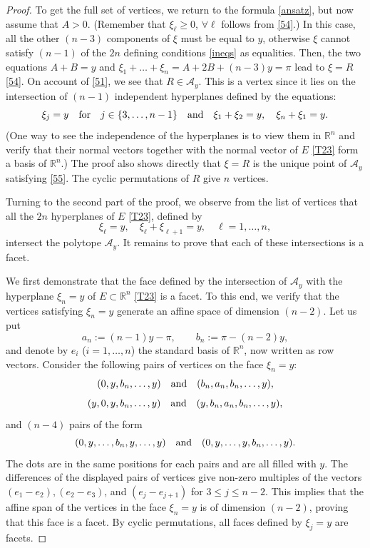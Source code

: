 \documentclass[a4paper,11pt,reqno]{amsart}
\theoremstyle{definition}
\numberwithin{equation}{section}
\newcommand{\be}{\begin{equation}}
\newcommand{\ee}{\end{equation}}
\def\cA{{\mathcal A}}                       %
\def\bR{{\mathbb R}}                        %
\begin{document}
\begin{proof}
 To get the full set of  vertices, we return to the formula \eqref{ansatz}, but now assume that $ A>0$.
 (Remember that  $\xi_\ell \geq 0$, $\forall \ell$ follows from  \eqref{54}.)
 In this case, all the other $(n-3)$ components of $\xi$ must be equal to $y$, otherwise $\xi$ cannot satisfy $(n-1)$ of the
 $2n$ defining  conditions \eqref{ineqs} as equalities. Then, the two equations $A + B =y$ and
 $\xi_1 + \dots + \xi_n= A + 2B + (n-3) y = \pi$  lead to $\xi=R$ \eqref{54}.
 On account of \eqref{51}, we see that $R \in \cA_y$.
 This is a vertex since
 it lies on the intersection of $(n-1)$ independent hyperplanes defined by
the equations:
\be
\xi_j = y \quad \hbox{for}\quad j \in \{3, \dots, n-1\}
\quad\hbox{and}\quad \xi_{1} + \xi_{2} = y, \quad \xi_{n} + \xi_1 =y.
\label{55}\ee
(One way to see
the independence of the hyperplanes is to view them in $\bR^n$ and verify that their normal vectors together with the
normal vector of $E$ \eqref{T23} form a basis of $\bR^n$.)
The proof also shows directly that $\xi=R$ is the unique point of $\cA_y$ satisfying \eqref{55}.
The cyclic permutations of $R$ give $n$ vertices.

Turning to the second part of the proof, we observe
from the  list of vertices that all the $2n$ hyperplanes of $E$ \eqref{T23}, defined by
\be
\xi_\ell = y,\quad \xi_\ell + \xi_{\ell+1}=y, \quad \ell=1,\dots, n,
\label{56}\ee
intersect the polytope $\cA_y$.
It remains to prove  that each of these intersections is a facet.

We  first demonstrate that the face defined by the intersection of $\cA_y$ with the hyperplane   $\xi_n=y$ of $E\subset \bR^n$
\eqref{T23}  is a facet.
To this end, we verify that the vertices satisfying $\xi_n=y$ generate an affine space of dimension $(n-2)$.
 Let us put
\be
a_n:= (n-1) y - \pi, \qquad b_n:= \pi - (n-2)y,
\ee
and denote by $e_i$ ($i=1,\dots,n$) the standard basis of $\bR^n$, now written as row vectors.
Consider the following pairs of vertices on the face $\xi_n=y$:
\be
(0,y,b_n,\dots, y)
\quad\hbox{and}\quad
(b_n,a_n,b_n,\dots, y),
\ee
\be
(y,0, y, b_n, \dots , y)
\quad\hbox{and}\quad
(y,b_n,a_n,b_n, \dots, y),
\ee
and $(n-4)$ pairs of the form
\be
(0,y, \dots,b_n,y,\dots, y)
\quad\hbox{and}\quad
(0,y,\dots, y,b_n,\dots, y).
\ee
The dots are in the same positions for each pairs and are all filled with $y$.
The differences of the displayed  pairs of vertices give non-zero multiples of the vectors
$(e_1-e_2), (e_2-e_3)$, and $(e_j - e_{j+1})$ for $3 \leq   j \leq n-2$.
This implies that the affine span of the vertices in the face $\xi_n=y$ is of dimension $(n-2)$,
proving that this face is a facet. By cyclic permutations, all faces defined
by $\xi_j=y$ are facets.


\end{proof}
\end{document}
